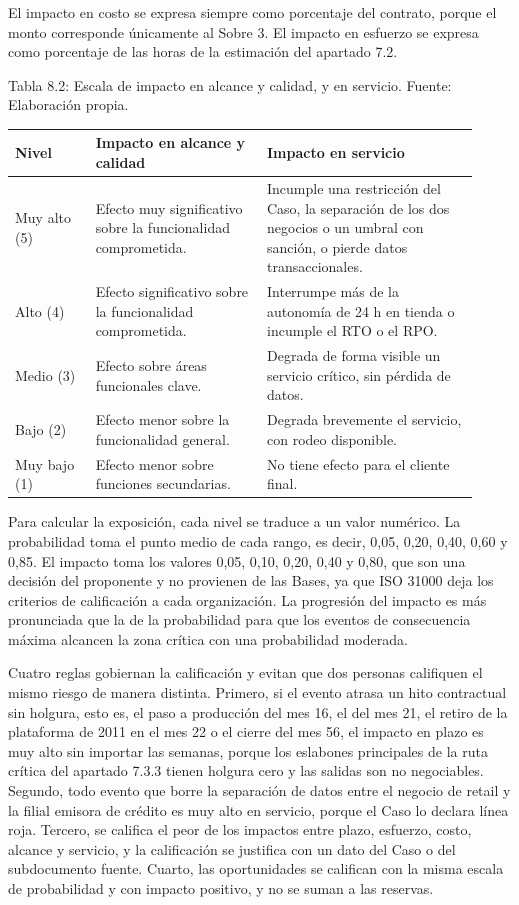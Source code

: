 \documentclass[11pt]{article}
\begin{document}
El impacto en costo se expresa siempre como porcentaje del contrato, porque el monto corresponde únicamente al Sobre 3. El impacto en esfuerzo se expresa como porcentaje de las horas de la estimación del apartado 7.2.

Tabla 8.2: Escala de impacto en alcance y calidad, y en servicio. Fuente: Elaboración propia.\label{tab:8-2}

\begin{longtable}{p{0.16\linewidth}p{0.34\linewidth}p{0.42\linewidth}}
\toprule
\textbf{Nivel} & \textbf{Impacto en alcance y calidad} & \textbf{Impacto en servicio} \\
\midrule
\endhead
\bottomrule
\endlastfoot
Muy alto (5) & Efecto muy significativo sobre la funcionalidad comprometida. & Incumple una restricción del Caso, la separación de los dos negocios o un umbral con sanción, o pierde datos transaccionales. \\
Alto (4) & Efecto significativo sobre la funcionalidad comprometida. & Interrumpe más de la autonomía de 24 h en tienda o incumple el RTO o el RPO. \\
Medio (3) & Efecto sobre áreas funcionales clave. & Degrada de forma visible un servicio crítico, sin pérdida de datos. \\
Bajo (2) & Efecto menor sobre la funcionalidad general. & Degrada brevemente el servicio, con rodeo disponible. \\
Muy bajo (1) & Efecto menor sobre funciones secundarias. & No tiene efecto para el cliente final. \\
\end{longtable}

Para calcular la exposición, cada nivel se traduce a un valor numérico. La probabilidad toma el punto medio de cada rango, es decir, 0,05, 0,20, 0,40, 0,60 y 0,85. El impacto toma los valores 0,05, 0,10, 0,20, 0,40 y 0,80, que son una decisión del proponente y no provienen de las Bases, ya que ISO 31000 deja los criterios de calificación a cada organización. La progresión del impacto es más pronunciada que la de la probabilidad para que los eventos de consecuencia máxima alcancen la zona crítica con una probabilidad moderada.

Cuatro reglas gobiernan la calificación y evitan que dos personas califiquen el mismo riesgo de manera distinta. Primero, si el evento atrasa un hito contractual sin holgura, esto es, el paso a producción del mes 16, el del mes 21, el retiro de la plataforma de 2011 en el mes 22 o el cierre del mes 56, el impacto en plazo es muy alto sin importar las semanas, porque los eslabones principales de la ruta crítica del apartado 7.3.3 tienen holgura cero y las salidas son no negociables. Segundo, todo evento que borre la separación de datos entre el negocio de retail y la filial emisora de crédito es muy alto en servicio, porque el Caso lo declara línea roja. Tercero, se califica el peor de los impactos entre plazo, esfuerzo, costo, alcance y servicio, y la calificación se justifica con un dato del Caso o del subdocumento fuente. Cuarto, las oportunidades se califican con la misma escala de probabilidad y con impacto positivo, y no se suman a las reservas.
\end{document}
